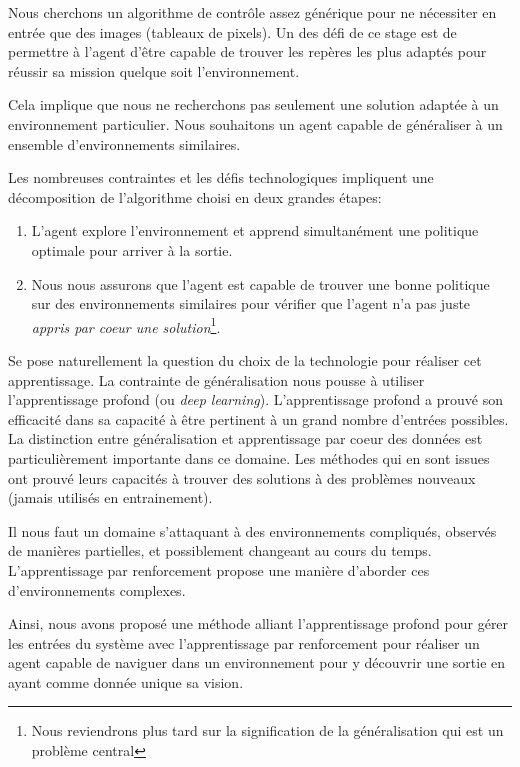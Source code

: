 Nous cherchons un algorithme de contrôle assez générique pour ne nécessiter en entrée que des images (tableaux de pixels). Un des défi de ce stage est de permettre à  l'agent d'être capable de trouver les repères les plus adaptés pour réussir sa mission quelque soit l'environnement.

Cela implique que nous ne recherchons pas seulement une solution adaptée à un environnement particulier. Nous souhaitons un agent capable de généraliser à un ensemble d'environnements similaires. 

Les nombreuses contraintes et les défis technologiques impliquent une décomposition de l'algorithme choisi en deux grandes étapes:

\begin{enumerate}
    \item L'agent explore l'environnement et apprend simultanément une politique optimale pour arriver à la sortie.
    \item Nous nous assurons que l'agent est capable de trouver une bonne politique sur des environnements similaires pour vérifier que l'agent n'a pas juste \emph{appris par coeur une solution}\footnote{Nous reviendrons plus tard sur la signification de la généralisation qui est un problème central}.
\end{enumerate}

Se pose naturellement la question du choix de la technologie pour réaliser cet apprentissage.
La contrainte de généralisation nous pousse à utiliser l'apprentissage profond (ou \emph{deep learning}). L'apprentissage profond a prouvé son efficacité dans sa capacité à être pertinent à un grand nombre d'entrées possibles.  
La distinction entre généralisation et apprentissage par coeur des données est particulièrement importante dans ce domaine. Les méthodes qui en sont issues ont prouvé leurs capacités à trouver des solutions à des problèmes nouveaux (jamais utilisés en entrainement).

Il nous faut un domaine s'attaquant à des environnements compliqués, observés de manières partielles, et possiblement changeant au cours du temps. L'apprentissage par renforcement propose une manière d'aborder ces d'environnements complexes. 

Ainsi, nous avons proposé une méthode alliant l'apprentissage profond pour gérer les entrées du système avec l'apprentissage par renforcement pour réaliser un agent capable de naviguer dans un environnement pour y découvrir une sortie en ayant comme donnée unique sa vision.
